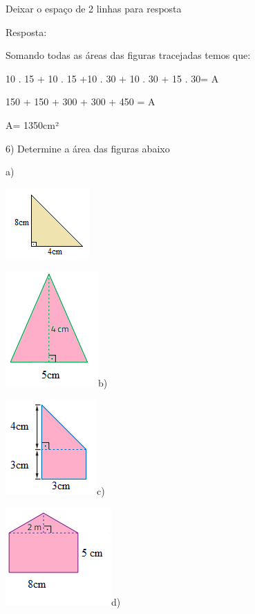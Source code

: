 {Deixar o espaço de 2 linhas para resposta

Resposta:

Somando todas as áreas das figuras tracejadas temos que:

10 . 15 + 10 . 15 +10 . 30 + 10 . 30 + 15 . 30= A

150 + 150 + 300 + 300 + 450 = A

A= 1350cm²

6) Determine a área das figuras abaixo

a)

\includegraphics[width=1.26042in,height=1.0625in]{./imgSAEB_8_MAT/media/image46.png}

\includegraphics[width=1.39583in,height=1.72917in]{./imgSAEB_8_MAT/media/image47.png}b)

\includegraphics[width=1.375in,height=1.42708in]{./imgSAEB_8_MAT/media/image48.png}c)

\includegraphics[width=1.59375in,height=1.46875in]{./imgSAEB_8_MAT/media/image49.png}d)

}
